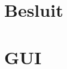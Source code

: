 \documentclass[eind]{penoverslag}
\begin{document}
\section*{Besluit}
\label{sec:Besluit}






\newpage\makeappendix

\section{GUI}
\label{App: AppendixA}


%
\end{document}
